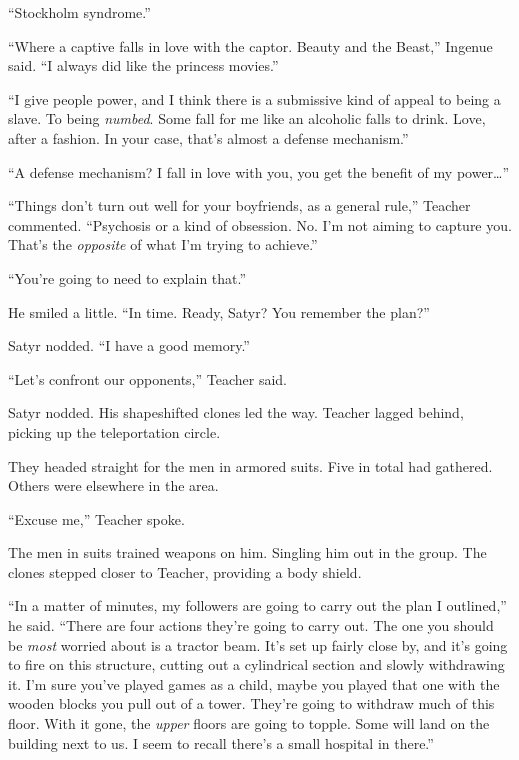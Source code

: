 ``Stockholm syndrome.''



``Where a captive falls in love with the captor.  Beauty and the Beast,'' Ingenue said.  ``I always did like the princess movies.''



``I give people power, and I think there is a submissive kind of appeal to being a slave.  To being \emph{numbed}.  Some fall for me like an alcoholic falls to drink.  Love, after a fashion.  In your case, that's almost a defense mechanism.''



``A defense mechanism?  I fall in love with you, you get the benefit of my power\ldots''



``Things don't turn out well for your boyfriends, as a general rule,'' Teacher commented.  ``Psychosis or a kind of obsession.  No.  I'm not aiming to capture you.  That's the \emph{opposite }of what I'm trying to achieve.''



``You're going to need to explain that.''



He smiled a little.  ``In time.  Ready, Satyr?  You remember the plan?''



Satyr nodded.  ``I have a good memory.''



``Let's confront our opponents,'' Teacher said.



Satyr nodded.  His shapeshifted clones led the way.  Teacher lagged behind, picking up the teleportation circle.



They headed straight for the men in armored suits.  Five in total had gathered.  Others were elsewhere in the area.



``Excuse me,'' Teacher spoke.



The men in suits trained weapons on him.  Singling him out in the group.  The clones stepped closer to Teacher, providing a body shield.



``In a matter of minutes, my followers are going to carry out the plan I outlined,'' he said.  ``There are four actions they're going to carry out.  The one you should be \emph{most} worried about is a tractor beam.  It's set up fairly close by, and it's going to fire on this structure, cutting out a cylindrical section and slowly withdrawing it.  I'm sure you've played games as a child, maybe you played that one with the wooden blocks you pull out of a tower.  They're going to withdraw much of this floor.  With it gone, the \emph{upper} floors are going to topple.  Some will land on the building next to us.  I seem to recall there's a small hospital in there.''



